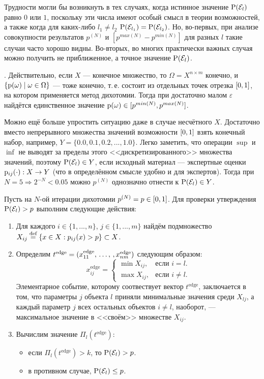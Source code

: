 Трудности могли бы возникнуть в тех случаях, когда истинное значение ${\mathrm{P}}(\mathcal{E}_l)$ равно $0$ или $1$, поскольку эти числа имеют особый смысл в теории возможностей, а также когда для каких-либо $l_1 \neq l_2$ ${\mathrm{P}}(\mathcal{E}_{l_1}) = {\mathrm{P}}(\mathcal{E}_{l_2})$. Но, во-первых, при анализе совокупности результатов $p^{(N)}$ и $[p^{max(N)} - p^{min(N)}]$ для разных $l$ такие случаи часто хорошо видны. Во-вторых, во многих практически важных случая можно получить не приближенное, а точное значение ${\mathrm{P}}(\mathcal{E}_l)$. 

.
Действительно, если $X$ --- конечное множество, то $\Omega=X^{n\times m}$ конечно, и $\{{\mathrm{p}}(\omega)\mid\omega\in\Omega\}$ --- тоже конечно, т.\,е. состоит из отдельных точек отрезка $[0,1]$, на котором применяется метод дихотомии. Тогда при достаточно малом $\varepsilon$ найдётся единственное значение ${\mathrm{p}}(\omega)\in[p^{min(N)}, p^{max(N)}]$. 

Можно ещё больше упростить ситуацию даже в случае несчётного $X$. Достаточно вместо непрерывного множества значений возможности $[0,1]$ взять конечный набор, например, $Y = \{0.0, 0.1, 0.2, ..., 1.0\}$. Легко заметить, что операции $\sup$ и $\inf$ не выводят за пределы этого <<дискретизированного>> множества значений, поэтому ${\mathrm{P}}(\mathcal{E}_l) \in Y$, если исходный материал --- экспертные оценки ${\mathrm{p}}_{ij}(\cdot): X \rightarrow Y$ (что в определённом смысле удобно и для экспертов). Тогда при $N = 5 \Rightarrow 2^{-N} < 0.05$ можно $p^{(N)}$ однозначно отнести к ${\mathrm{P}}(\mathcal{E}_l) \in Y$.

Пусть на $N$-ой итерации дихотомии $p^{(N)} = p \in [0,1]$. Для проверки утверждения ${\mathrm{P}}(\mathcal{E}_l) > p$ выполним следующие действия: 
\begin{enumerate}
  \item 
  Для каждого $i \in \{1, ..., n\}$, $j \in \{1, ..., m\}$ найдём подмножество $X_{ij} \overset{\text{def}}{=} \{x \in X: p_{ij}(x) > p\} \subset X$. 
  \item 
  Определим $t^\text{edge} = (x_{11}^\text{edge}, \, \ldots,\,, x_{nm}^\text{edge})$ следующим образом:
  \begin{equation*}
    x_{ij}^\text{edge} =
    \begin{cases}
      \min X_{ij}, &\text{если $i = l$.}\\
      \max X_{ij}, &\text{если $i \neq l$.} 
    \end{cases}
  \end{equation*}
  Элементарное событие, которому соотвествует вектор $t^\text{edge}$, заключается в том, что параметры $j$ объекта $l$ приняли минимальные значения среди $X_{lj}$, а каждый параметр $j$ всех остальных объектов $i \neq l$, наоборот, --- максимальное значение в <<своём>> множестве $X_{ij}$. 
  \item	%
  Вычислим значение $\Pi_l(t^\text{edge})$: 
 	\begin{itemize}
		\item если $\Pi_l(t^\text{edge}) > k$, то ${\mathrm{P}}(\mathcal{E}_l) > p$.
		\item в противном случае, ${\mathrm{P}}(\mathcal{E}_l) \leq p$.
	\end{itemize} 
\end{enumerate}  

